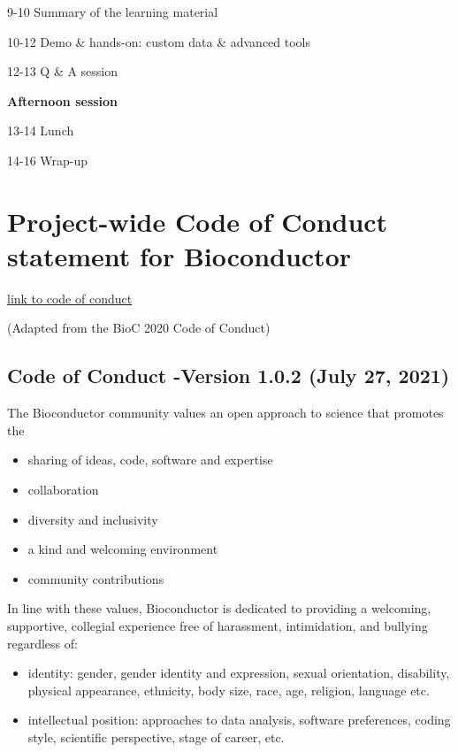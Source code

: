\documentclass[
  oneside]{book}
\providecommand{\tightlist}{%
  \setlength{\itemsep}{0pt}\setlength{\parskip}{0pt}}
\begin{document}
9-10 Summary of the learning material

10-12 Demo \& hands-on: custom data \& advanced tools

12-13 Q \& A session

\textbf{Afternoon session}

13-14 Lunch

14-16 Wrap-up

\hypertarget{project-wide-code-of-conduct-statement-for-bioconductor}{%
\chapter{Project-wide Code of Conduct statement for Bioconductor}\label{project-wide-code-of-conduct-statement-for-bioconductor}}

\href{https://bioconductor.github.io/bioc_coc_multilingual/}{link to code of conduct}

(Adapted from the BioC 2020 Code of Conduct)

\hypertarget{code-of-conduct--version-1.0.2-july-27-2021}{%
\section{Code of Conduct -Version 1.0.2 (July 27, 2021)}\label{code-of-conduct--version-1.0.2-july-27-2021}}

The Bioconductor community values an open approach to science that promotes the

\begin{itemize}
\tightlist
\item
  sharing of ideas, code, software and expertise
\item
  collaboration
\item
  diversity and inclusivity
\item
  a kind and welcoming environment
\item
  community contributions
\end{itemize}

In line with these values, Bioconductor is dedicated to providing a welcoming, supportive, collegial experience free of harassment, intimidation, and bullying regardless of:

\begin{itemize}
\tightlist
\item
  identity: gender, gender identity and expression, sexual orientation, disability, physical appearance, ethnicity, body size, race, age, religion, language etc.
\item
  intellectual position: approaches to data analysis, software preferences, coding style, scientific perspective, stage of career, etc.
\end{itemize}
\end{document}
